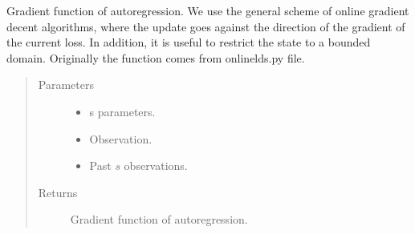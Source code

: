 \documentclass[letterpaper,10pt,english]{sphinxmanual}
\begin{document}

\begin{fulllineitems}
\label{\detokenize{LDS:LDS.OnlineLDS_library.gradient_ar}}
\sphinxAtStartPar
Gradient function of auto\sphinxhyphen{}regression.
We use the general scheme of on\sphinxhyphen{}line gradient decent algorithms,
where the update goes against the direction of the gradient of the current loss.
In addition, it is useful to restrict the state to a bounded domain.
Originally the function comes from onlinelds.py file.
\begin{quote}\begin{description}
\item[{Parameters}] \leavevmode\begin{itemize}
\item {} 
\sphinxAtStartPar
{} \textendash{} s parameters.

\item {} 
\sphinxAtStartPar
{}\sphinxstyleliteralstrong{\sphinxupquote{{[}}}\sphinxstyleliteralstrong{\sphinxupquote{{]}}} \textendash{} Observation.

\item {} 
\sphinxAtStartPar
{}\sphinxstyleliteralstrong{\sphinxupquote{{[}}}\sphinxstyleliteralstrong{\sphinxupquote{{]}}} \textendash{} Past \(s\) observations.

\end{itemize}

\item[{Returns}] \leavevmode
\sphinxAtStartPar
Gradient function of auto\sphinxhyphen{}regression.

\end{description}\end{quote}

\end{fulllineitems}

\end{document}
